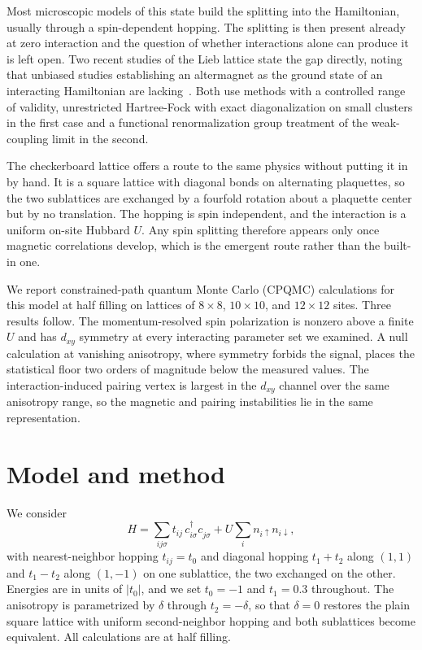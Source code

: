 \documentclass[aps,prl,reprint,superscriptaddress,amsmath,amssymb,floatfix]{revtex4-2}
\begin{document}
Most microscopic models of this state build the splitting into the Hamiltonian,
usually through a spin-dependent hopping. The splitting is then present already
at zero interaction and the question of whether interactions alone can produce
it is left open. Two recent studies of the Lieb lattice state the gap directly,
noting that unbiased studies establishing an altermagnet as the ground state of
an interacting Hamiltonian are lacking~\cite{Kaushal2025,Duerrnagel2025}. Both
use methods with a controlled range of validity, unrestricted Hartree-Fock with
exact diagonalization on small clusters in the first case and a functional
renormalization group treatment of the weak-coupling limit in the second.

The checkerboard lattice offers a route to the same physics without putting it
in by hand. It is a square lattice with diagonal bonds on alternating
plaquettes, so the two sublattices are exchanged by a fourfold rotation about a
plaquette center but by no translation. The hopping is spin independent, and
the interaction is a uniform on-site Hubbard $U$. Any spin splitting therefore
appears only once magnetic correlations develop, which is the emergent route
rather than the built-in one.

We report constrained-path quantum Monte Carlo (CPQMC) calculations for this
model at half filling on lattices of $8\times8$, $10\times10$, and $12\times12$
sites. Three results follow. The momentum-resolved spin polarization is nonzero
above a finite $U$ and has $d_{xy}$ symmetry at every interacting parameter set
we examined. A null calculation at vanishing anisotropy, where symmetry forbids
the signal, places the statistical floor two orders of magnitude below the
measured values. The interaction-induced pairing vertex is largest in the
$d_{xy}$ channel over the same anisotropy range, so the magnetic and pairing
instabilities lie in the same representation.

\section{Model and method}

We consider
\begin{equation}
H = \sum_{ij\sigma} t_{ij}\, c^{\dagger}_{i\sigma} c^{\phantom{\dagger}}_{j\sigma}
    + U \sum_i n_{i\uparrow} n_{i\downarrow},
\label{eq:H}
\end{equation}
with nearest-neighbor hopping $t_{ij} = t_0$ and diagonal hopping
$t_1 + t_2$ along $(1,1)$ and $t_1 - t_2$ along $(1,-1)$ on one sublattice, the
two exchanged on the other. Energies are in units of $|t_0|$, and we set
$t_0 = -1$ and $t_1 = 0.3$ throughout. The anisotropy is parametrized by
$\delta$ through $t_2 = -\delta$, so that $\delta = 0$ restores the plain square
lattice with uniform second-neighbor hopping and both sublattices become
equivalent. All calculations are at half filling.
\end{document}
